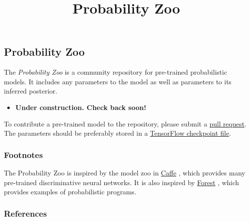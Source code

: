 \title{Probability Zoo}

\subsection{Probability Zoo}

The \emph{Probability Zoo} is a community repository for pre-trained
probabilistic models. It includes any parameters to the model as well
as parameters to its inferred posterior.

\begin{itemize}
\item \textbf{Under construction. Check back soon!}
\end{itemize}

To contribute a pre-trained model to the repository, please submit a
\href{https://github.com/blei-lab/edward/pulls}{pull request}.
The parameters should be preferably stored in a
\href{https://www.tensorflow.org/versions/master/how_tos/variables/}
{TensorFlow checkpoint file}.

\subsubsection{Footnotes}

The Probability Zoo is inspired by the model zoo in
\href{http://caffe.berkeleyvision.org}{Caffe} \citep{jia2014caffe},
which provides many pre-trained discriminative neural networks.
It is also inspired by \href{http://forestdb.org}{Forest}
\citep{stuhlmueller2012forest}, which
provides examples of probabilistic programs.

\subsubsection{References}\label{references}
